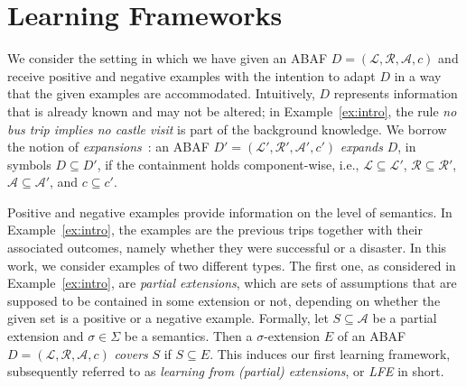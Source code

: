 \documentclass[letterpaper]{article} %
\newcommand{\asms}{\asm}
\newcommand{\asm}{\ensuremath{\mathcal{A}}}
\newcommand{\atoms}{\mathcal{L}}
\newcommand{\ruleset}{\mathcal{R}}
\newcommand{\assumptions}{\mathcal{A}}
\newcommand{\contra}{c}
\newcommand{\contraryempty}{c}
\newcommand{\ABAdef}{D=(\atoms,\ruleset,\assumptions,\contra)}
\begin{document}
\section{Learning Frameworks}
\label{sec:learning without hypothesis space}
We consider the setting in which we have given an ABAF $\ABAdef$ and receive positive and negative examples with the intention to adapt $D$ in a way that the given examples are accommodated. Intuitively, $D$ represents information that is already known and may not be altered; in Example~\ref{ex:intro}, the rule \emph{no bus trip implies no castle visit} is part of the background knowledge.
We borrow the notion of \emph{expansions}~\cite{Baumann12}:
an ABAF $D'=(\mathcal L',\mathcal R',\mathcal A',\contraryempty')$ \emph{expands} $D$, in symbols $D\subseteq D'$, if the containment holds component-wise, i.e., $\mathcal L\subseteq \mathcal L'$, $\mathcal R\subseteq \mathcal R'$, $\mathcal A\subseteq \mathcal A'$, and $c\subseteq c'$. 

Positive and negative examples provide information on the level of semantics.
In Example~\ref{ex:intro}, the examples are the previous trips together with their associated outcomes, namely whether they were successful or a disaster.
In this work, we consider examples of two different types. The first one, as considered in Example~\ref{ex:intro}, are \emph{partial extensions}, which are sets of assumptions that are supposed to be contained in some extension or not, depending on whether the given set is a positive or a negative example.
Formally, let $S\subseteq \asms$ be a partial extension and $\sigma\in\Sigma$ be a semantics. Then a $\sigma$-extension $E$ of an ABAF $\ABAdef$ \emph{covers} $S$ if $S\subseteq E$.
This induces our first learning framework, subsequently referred to as \emph{learning from (partial) extensions}, or \emph{LFE} in short.
\end{document}
